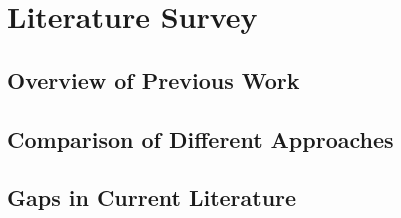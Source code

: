 \chapter{Literature Survey}
\label{ch:literature}


\section{Overview of Previous Work}
\label{sec:lit-previous}


\section{Comparison of Different Approaches}
\label{sec:lit-comparison}


\section{Gaps in Current Literature}
\label{sec:lit-gaps}

